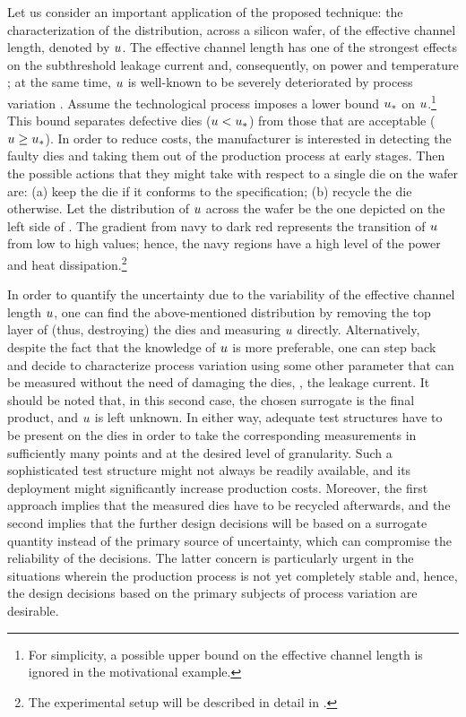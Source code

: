 
Let us consider an important application of the proposed technique: the characterization of the distribution, across a silicon wafer, of the effective channel length, denoted by $u$. The effective channel length has one of the strongest effects on the subthreshold leakage current and, consequently, on power and temperature \cite{juan2012}; at the same time, $u$ is well-known to be severely deteriorated by process variation \cite{chandrakasan2001, srivastava2010}.
Assume the technological process imposes a lower bound $u_*$ on $u$.\footnote{For simplicity, a possible upper bound on the effective channel length is ignored in the motivational example.} This bound separates defective dies ($u < u_*$) from those that are acceptable ($u \geq u_*$).
In order to reduce costs, the manufacturer is interested in detecting the faulty dies and taking them out of the production process at early stages.
Then the possible actions that they might take with respect to a single die on the wafer are: (a) keep the die if it conforms to the specification; (b) recycle the die otherwise.
Let the distribution of $u$ across the wafer be the one depicted on the left side of .
The gradient from navy to dark red represents the transition of $u$ from low to high values; hence, the navy regions have a high level of the power and heat dissipation.\footnote{The experimental setup will be described in detail in .}

In order to quantify the uncertainty due to the variability of the effective channel length $u$, one can find the above-mentioned distribution by removing the top layer of (thus, destroying) the dies and measuring $u$ directly.
Alternatively, despite the fact that the knowledge of $u$ is more preferable, one can step back and decide to characterize process variation using some other parameter that can be measured without the need of damaging the dies, \eg, the leakage current.
It should be noted that, in this second case, the chosen surrogate is the final product, and $u$ is left unknown.
In either way, adequate test structures have to be present on the dies in order to take the corresponding measurements in sufficiently many points and at the desired level of granularity.
Such a sophisticated test structure might not always be readily available, and its deployment might significantly increase production costs.
Moreover, the first approach implies that the measured dies have to be recycled afterwards, and the second implies that the further design decisions will be based on a surrogate quantity instead of the primary source of uncertainty, which can compromise the reliability of the decisions.
The latter concern is particularly urgent in the situations wherein the production process is not yet completely stable and, hence, the design decisions based on the primary subjects of process variation are desirable.

